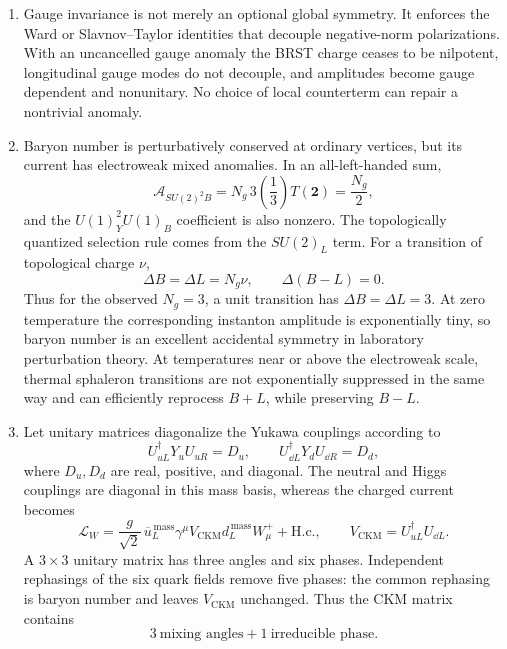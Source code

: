 \begin{enumerate}
\begin{enumerate}
    \item[(ii)]
    Gauge invariance is not merely an optional global symmetry.  It
    enforces the Ward or Slavnov--Taylor identities that decouple
    negative-norm polarizations.  With an uncancelled gauge anomaly the
    BRST charge ceases to be nilpotent, longitudinal gauge modes do not
    decouple, and amplitudes become gauge dependent and nonunitary.
    No choice of local counterterm can repair a nontrivial anomaly.

    \item[(iii)]
    Baryon number is perturbatively conserved at ordinary vertices, but
    its current has electroweak mixed anomalies.  In an all-left-handed
    sum,
    \[
      \mathcal A_{SU(2)^2B}
        =N_g\,3\left(\frac13\right)T(\mathbf2)
        =\frac{N_g}{2},
    \]
    and the \(U(1)_Y^2U(1)_B\) coefficient is also nonzero.  The
    topologically quantized selection rule comes from the \(SU(2)_L\)
    term.  For a transition of topological charge \(\nu\),
    \[
      \boxed{\Delta B=\Delta L=N_g\nu,\qquad
       \Delta(B-L)=0.}
    \]
    Thus for the observed \(N_g=3\), a unit transition has
    \(\Delta B=\Delta L=3\).  At zero temperature the corresponding
    instanton amplitude is exponentially tiny, so baryon number is an
    excellent accidental symmetry in laboratory perturbation theory.
    At temperatures near or above the electroweak scale, thermal
    sphaleron transitions are not exponentially suppressed in the same
    way and can efficiently reprocess \(B+L\), while preserving \(B-L\).

    \item[(iv)]
    Let unitary matrices diagonalize the Yukawa couplings according to
    \[
      U_{uL}^\dagger Y_uU_{uR}=D_u,\qquad
      U_{\dd L}^\dagger Y_dU_{\dd R}=D_d,
    \]
    where \(D_u,D_d\) are real, positive, and diagonal.  The neutral and
    Higgs couplings are diagonal in this mass basis, whereas the charged
    current becomes
    \[
      \mathcal L_W
       =\frac{g}{\sqrt2}\,
        \overline u_L^{\,\mathrm{mass}}\gamma^\mu
        V_{\mathrm{CKM}}d_L^{\,\mathrm{mass}}W_\mu^+
        +\mathrm{H.c.},
      \qquad
      \boxed{V_{\mathrm{CKM}}=U_{uL}^\dagger U_{\dd L}.}
    \]
    A \(3\times3\) unitary matrix has three angles and six phases.
    Independent rephasings of the six quark fields remove five phases:
    the common rephasing is baryon number and leaves \(V_{\mathrm{CKM}}\)
    unchanged.  Thus the CKM matrix contains
    \[
      \boxed{3\ \text{mixing angles}+1\ \text{irreducible phase}.}
    \]


\end{enumerate}
\end{enumerate}
